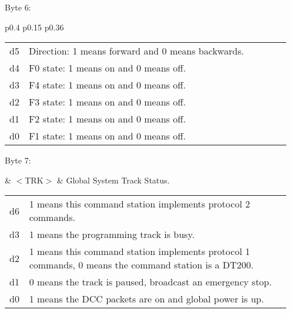 Byte 6:

\begin{tabular}{p{0.4\linewidth} p{0.15\linewidth} p{0.36\linewidth}} 

\begin{tabular}{|p{0.3cm}|p{0.3cm}|p{0.3cm}|p{0.3cm}|p{0.3cm}|p{0.3cm}|p{0.3cm}|p{0.3cm}|}
\hline
0 & 0 & d5 & d4 & d3 & d2 & d1 & d0\\
\hline
\end{tabular}
& $<$DIRF$>$ & Locomotive direction and state of functions F0 to F4.\\
\end{tabular}

\begin{tabular}{p{0.05\linewidth} p{0.95\linewidth}} 
d5 & Direction: 1 means forward and 0 means backwards.\\
d4 & F0 state: 1 means on and 0 means off.\\
d3 & F4 state: 1 means on and 0 means off.\\
d2 & F3 state: 1 means on and 0 means off.\\
d1 & F2 state: 1 means on and 0 means off.\\
d0 & F1 state: 1 means on and 0 means off.\\
\end{tabular}

Byte 7:

& $<$TRK$>$ & \gls{Global System Track Status}.\\
\end{tabular}

\begin{tabular}{p{0.05\linewidth} p{0.9\linewidth}} 
d6 & 1 means this command station implements protocol 2 commands.\\
d3 & 1 means the programming track is busy.\\
d2 & 1 means this command station implements protocol 1 commands,  0 means the command station is a DT200.\\
d1 & 0 means the track is paused, broadcast an emergency stop.\\
d0 & 1 means the DCC packets are on and global power is up.\\
\end{tabular}

